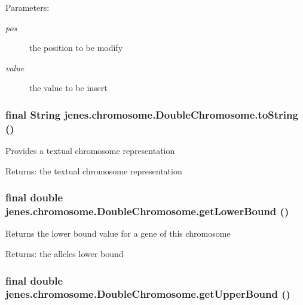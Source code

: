 \begin{Desc}
\item[Parameters:]
\begin{description}
\item[{\em pos}]the position to be modify \item[{\em value}]the value to be insert \end{description}
\end{Desc}
\hypertarget{classjenes_1_1chromosome_1_1_double_chromosome_eaf1116586c3fac1fa8c1dad28b7f727}{
\subsubsection[toString]{\setlength{\rightskip}{0pt plus 5cm}final String jenes.chromosome.DoubleChromosome.toString ()}}
\label{classjenes_1_1chromosome_1_1_double_chromosome_eaf1116586c3fac1fa8c1dad28b7f727}


Provides a textual chromosome representation \begin{Desc}
\item[Returns:]the textual chromosome representation \end{Desc}
\hypertarget{classjenes_1_1chromosome_1_1_double_chromosome_a45c550b4cb16cba001dd6c754a5d8bd}{
\subsubsection[getLowerBound]{\setlength{\rightskip}{0pt plus 5cm}final double jenes.chromosome.DoubleChromosome.getLowerBound ()}}
\label{classjenes_1_1chromosome_1_1_double_chromosome_a45c550b4cb16cba001dd6c754a5d8bd}


Returns the lower bound value for a gene of this chromosome

\begin{Desc}
\item[Returns:]the alleles lower bound \end{Desc}
\hypertarget{classjenes_1_1chromosome_1_1_double_chromosome_7f4fe0c4dd1645f02ebbb2633d6610c8}{
\subsubsection[getUpperBound]{\setlength{\rightskip}{0pt plus 5cm}final double jenes.chromosome.DoubleChromosome.getUpperBound ()}}
\label{classjenes_1_1chromosome_1_1_double_chromosome_7f4fe0c4dd1645f02ebbb2633d6610c8}


